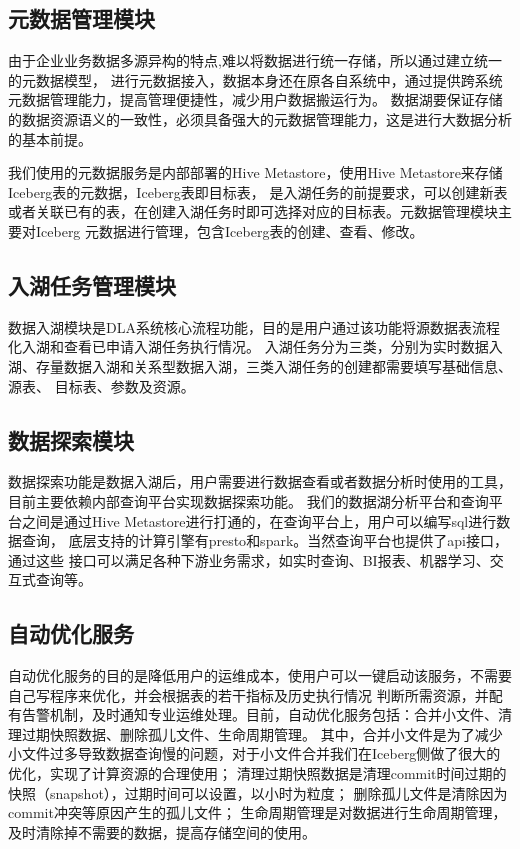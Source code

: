 \subsection{元数据管理模块}

由于企业业务数据多源异构的特点,难以将数据进行统一存储，所以通过建立统一的元数据模型\cite{18,19}，
进行元数据接入，数据本身还在原各自系统中，通过提供跨系统元数据管理能力，提高管理便捷性，减少用户数据搬运行为。
数据湖要保证存储的数据资源语义的一致性，必须具备强大的元数据管理能力，这是进行大数据分析的基本前提\cite{20}。

我们使用的元数据服务是内部部署的Hive Metastore，使用Hive Metastore来存储Iceberg表的元数据，Iceberg表即目标表，
是入湖任务的前提要求，可以创建新表或者关联已有的表，在创建入湖任务时即可选择对应的目标表。元数据管理模块主要对Iceberg
元数据进行管理，包含Iceberg表的创建、查看、修改。

\subsection{入湖任务管理模块}

数据入湖模块是DLA系统核心流程功能，目的是用户通过该功能将源数据表流程化入湖和查看已申请入湖任务执行情况。
入湖任务分为三类，分别为实时数据入湖、存量数据入湖和关系型数据入湖，三类入湖任务的创建都需要填写基础信息、源表、
目标表、参数及资源。

\subsection{数据探索模块}

数据探索功能是数据入湖后，用户需要进行数据查看或者数据分析时使用的工具，目前主要依赖内部查询平台实现数据探索功能。
我们的数据湖分析平台和查询平台之间是通过Hive Metastore\cite{30}进行打通的，在查询平台上，用户可以编写sql进行数据查询，
底层支持的计算引擎有presto\cite{16}和spark\cite{23}。当然查询平台也提供了api接口，通过这些
接口可以满足各种下游业务需求，如实时查询、BI报表、机器学习、交互式查询等。

\subsection{自动优化服务}

自动优化服务的目的是降低用户的运维成本，使用户可以一键启动该服务，不需要自己写程序来优化，并会根据表的若干指标及历史执行情况
判断所需资源，并配有告警机制，及时通知专业运维处理。目前，自动优化服务包括：合并小文件、清理过期快照数据、删除孤儿文件、生命周期管理。
其中，合并小文件是为了减少小文件过多导致数据查询慢的问题，对于小文件合并我们在Iceberg侧做了很大的优化，实现了计算资源的合理使用；
清理过期快照数据是清理commit时间过期的快照（snapshot），过期时间可以设置，以小时为粒度；
删除孤儿文件是清除因为commit冲突等原因产生的孤儿文件；
生命周期管理是对数据进行生命周期管理，及时清除掉不需要的数据，提高存储空间的使用。

